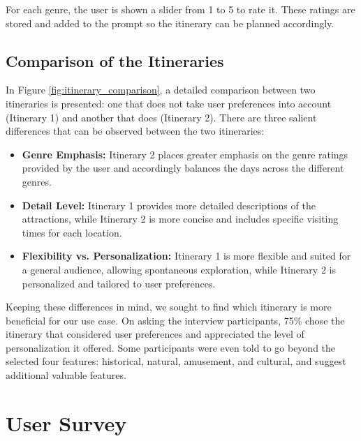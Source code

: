 \documentclass[manuscript,review,anonymous]{acmart}
\begin{document}
        For each genre, the user is shown a slider from 1 to 5 to rate it. These ratings are stored and added to the prompt so the itinerary can be planned accordingly.
    
    \vspace{-7pt}
    
    \subsection{Comparison of the Itineraries}
        
        In Figure \ref{fig:itinerary_comparison}, a detailed comparison between two itineraries is presented: one that does not take user preferences into account (Itinerary 1) and another that does (Itinerary 2). There are three salient differences that can be observed between the two itineraries:
    
        \begin{itemize}[noitemsep, topsep=5pt, parsep=0pt, partopsep=0pt]
        \item \textbf{Genre Emphasis:} Itinerary 2 places greater emphasis on the genre ratings provided by the user and accordingly balances the days across the different genres.
        
        \item \textbf{Detail Level:} Itinerary 1 provides more detailed descriptions of the attractions, while Itinerary 2 is more concise and includes specific visiting times for each location.
        
        \item \textbf{Flexibility vs. Personalization:} Itinerary 1 is more flexible and suited for a general audience, allowing spontaneous exploration, while Itinerary 2 is personalized and tailored to user preferences.
        \end{itemize}
        
        Keeping these differences in mind, we sought to find which itinerary is more beneficial for our use case. On asking the interview participants, 75\% chose the itinerary that considered user preferences and appreciated the level of personalization it offered. Some participants were even told to go beyond the selected four features: historical, natural, amusement, and cultural, and suggest additional valuable features.

\vspace{-7pt}

\section{User Survey}
    
\end{document}
